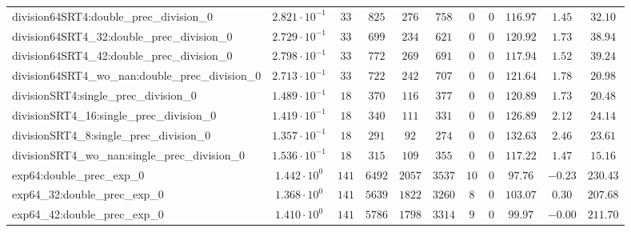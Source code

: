 \begin{tabular}{|l|c|c|c|c|c|c|c|c|c|c|}
division64SRT4:double\_prec\_division\_0                  & $ 2.821 \cdot 10^{-1} $ & $ 33     $ & $ 825    $ & $ 276   $ & $ 758   $ & $ 0   $ & $ 0 $ & $ 116.97      $ & $ 1.45    $ & $ 32.10   $ \\
division64SRT4\_32:double\_prec\_division\_0              & $ 2.729 \cdot 10^{-1} $ & $ 33     $ & $ 699    $ & $ 234   $ & $ 621   $ & $ 0   $ & $ 0 $ & $ 120.92      $ & $ 1.73    $ & $ 38.94   $ \\
division64SRT4\_42:double\_prec\_division\_0              & $ 2.798 \cdot 10^{-1} $ & $ 33     $ & $ 772    $ & $ 269   $ & $ 691   $ & $ 0   $ & $ 0 $ & $ 117.94      $ & $ 1.52    $ & $ 39.24   $ \\
division64SRT4\_wo\_nan:double\_prec\_division\_0         & $ 2.713 \cdot 10^{-1} $ & $ 33     $ & $ 722    $ & $ 242   $ & $ 707   $ & $ 0   $ & $ 0 $ & $ 121.64      $ & $ 1.78    $ & $ 20.98   $ \\
divisionSRT4:single\_prec\_division\_0                    & $ 1.489 \cdot 10^{-1} $ & $ 18     $ & $ 370    $ & $ 116   $ & $ 377   $ & $ 0   $ & $ 0 $ & $ 120.89      $ & $ 1.73    $ & $ 20.48   $ \\
divisionSRT4\_16:single\_prec\_division\_0                & $ 1.419 \cdot 10^{-1} $ & $ 18     $ & $ 340    $ & $ 111   $ & $ 331   $ & $ 0   $ & $ 0 $ & $ 126.89      $ & $ 2.12    $ & $ 24.14   $ \\
divisionSRT4\_8:single\_prec\_division\_0                 & $ 1.357 \cdot 10^{-1} $ & $ 18     $ & $ 291    $ & $ 92    $ & $ 274   $ & $ 0   $ & $ 0 $ & $ 132.63      $ & $ 2.46    $ & $ 23.61   $ \\
divisionSRT4\_wo\_nan:single\_prec\_division\_0           & $ 1.536 \cdot 10^{-1} $ & $ 18     $ & $ 315    $ & $ 109   $ & $ 355   $ & $ 0   $ & $ 0 $ & $ 117.22      $ & $ 1.47    $ & $ 15.16   $ \\
exp64:double\_prec\_exp\_0                                & $ 1.442 \cdot 10^{0}  $ & $ 141    $ & $ 6492   $ & $ 2057  $ & $ 3537  $ & $ 10  $ & $ 0 $ & $ 97.76       $ & $ -0.23   $ & $ 230.43  $ \\
exp64\_32:double\_prec\_exp\_0                            & $ 1.368 \cdot 10^{0}  $ & $ 141    $ & $ 5639   $ & $ 1822  $ & $ 3260  $ & $ 8   $ & $ 0 $ & $ 103.07      $ & $ 0.30    $ & $ 207.68  $ \\
exp64\_42:double\_prec\_exp\_0                            & $ 1.410 \cdot 10^{0}  $ & $ 141    $ & $ 5786   $ & $ 1798  $ & $ 3314  $ & $ 9   $ & $ 0 $ & $ 99.97       $ & $ -0.00   $ & $ 211.70  $ \\

\end{tabular}
